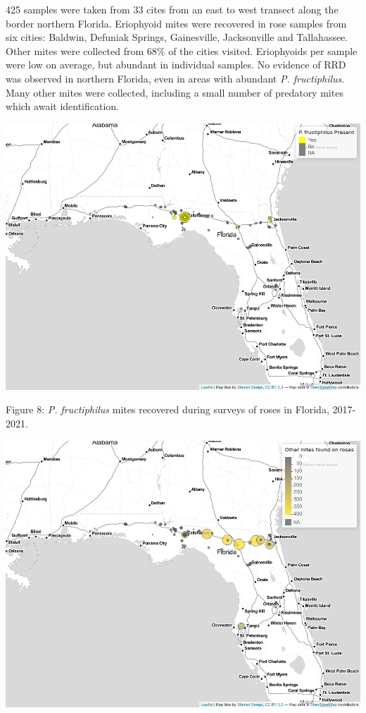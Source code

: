 \documentclass[12pt,final,CPage]{ufthesis}
\begin{document}
{  425 samples were taken from 33 cites from an east to west transect along the border northern Florida. Eriophyoid mites were recovered in rose samples from six cities: Baldwin, Defuniak Springs, Gainesville, Jacksonville and Tallahassee. Other mites were collected from 68\% of the cities visited. Eriophyoids per sample were low on average, but abundant in individual samples. No evidence of RRD was observed in northern Florida, even in areas with abundant \emph{P. fructiphilus}. Many other mites were collected, including a small number of predatory mites which await identification.
  \begin{center}\includegraphics[width=0.85\linewidth]{figure/rrv_survey_map_fl_pf} \end{center}

  Figure 8: \emph{P. fructiphilus} mites recovered during surveys of roses in Florida, 2017-2021.
  \begin{center}\includegraphics[width=0.85\linewidth]{figure/rrv_survey_map_fl_other} \end{center}

}
\end{document}
